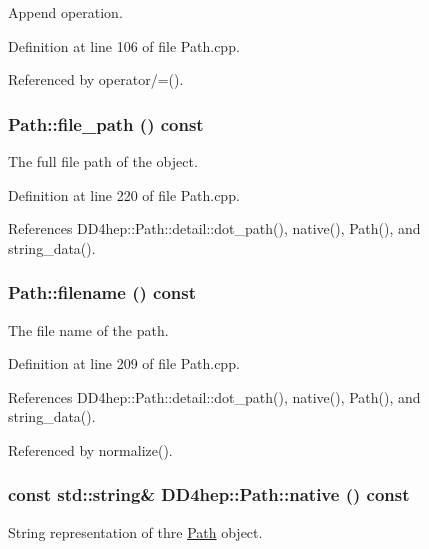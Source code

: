 Append operation. 

Definition at line 106 of file Path.cpp.

Referenced by operator/=().\hypertarget{class_d_d4hep_1_1_path_a82c9926859aafdb6b107001787f6fecb}{
\subsubsection[{file\_\-path}]{ Path::file\_\-path () const}}
\label{class_d_d4hep_1_1_path_a82c9926859aafdb6b107001787f6fecb}


The full file path of the object. 

Definition at line 220 of file Path.cpp.

References DD4hep::Path::detail::dot\_\-path(), native(), Path(), and string\_\-data().\hypertarget{class_d_d4hep_1_1_path_af8ae8422a7922589ff46d82e222658d0}{
\subsubsection[{filename}]{ Path::filename () const}}
\label{class_d_d4hep_1_1_path_af8ae8422a7922589ff46d82e222658d0}


The file name of the path. 

Definition at line 209 of file Path.cpp.

References DD4hep::Path::detail::dot\_\-path(), native(), Path(), and string\_\-data().

Referenced by normalize().\hypertarget{class_d_d4hep_1_1_path_a7d991762025ef6fe125386880be1f690}{
\subsubsection[{native}]{\setlength{\rightskip}{0pt plus 5cm}const std::string\& DD4hep::Path::native () const}}
\label{class_d_d4hep_1_1_path_a7d991762025ef6fe125386880be1f690}


String representation of thre \hyperlink{class_d_d4hep_1_1_path}{Path} object. 

